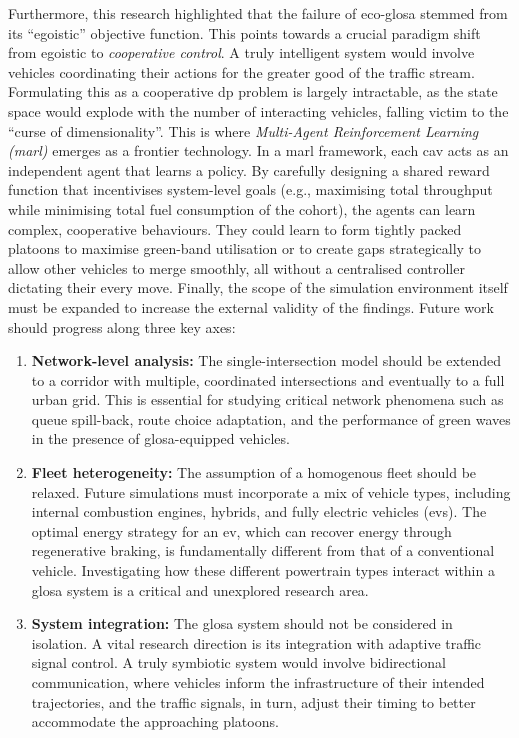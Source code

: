 Furthermore, this research highlighted that the failure of \ac{eco-glosa} stemmed from its \enquote{egoistic} objective function. This points towards a crucial paradigm shift from egoistic to \textit{cooperative control}. A truly intelligent system would involve vehicles coordinating their actions for the greater good of the traffic stream. Formulating this as a cooperative \ac{dp} problem is largely intractable, as the state space would explode with the number of interacting vehicles, falling victim to the \enquote{curse of dimensionality}. This is where \textit{Multi-Agent Reinforcement Learning (\ac{marl})} emerges as a frontier technology. In a \ac{marl} framework, each \ac{cav} acts as an independent agent that learns a policy. By carefully designing a shared reward function that incentivises system-level goals (e.g., maximising total throughput while minimising total fuel consumption of the cohort), the agents can learn complex, cooperative behaviours. They could learn to form tightly packed platoons to maximise green-band utilisation or to create gaps strategically to allow other vehicles to merge smoothly, all without a centralised controller dictating their every move.
\mynewline
Finally, the scope of the simulation environment itself must be expanded to increase the external validity of the findings. Future work should progress along three key axes:
\begin{enumerate}
    \item \textbf{Network-level analysis:} The single-intersection model should be extended to a corridor with multiple, coordinated intersections and eventually to a full urban grid. This is essential for studying critical network phenomena such as queue spill-back, route choice adaptation, and the performance of green waves in the presence of \ac{glosa}-equipped vehicles.
    \item \textbf{Fleet heterogeneity:} The assumption of a homogenous fleet should be relaxed. Future simulations must incorporate a mix of vehicle types, including internal combustion engines, hybrids, and fully electric vehicles (\acp{ev}). The optimal energy strategy for an \ac{ev}, which can recover energy through regenerative braking, is fundamentally different from that of a conventional vehicle. Investigating how these different powertrain types interact within a \ac{glosa} system is a critical and unexplored research area.
    \item \textbf{System integration:} The \ac{glosa} system should not be considered in isolation. A vital research direction is its integration with adaptive traffic signal control. A truly symbiotic system would involve bidirectional communication, where vehicles inform the infrastructure of their intended trajectories, and the traffic signals, in turn, adjust their timing to better accommodate the approaching platoons.
\end{enumerate}

